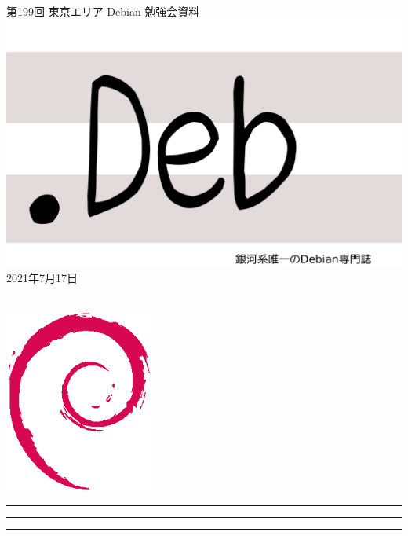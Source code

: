 \documentclass[mingoth,a4paper]{jsarticle}
\newcommand{\debmtgyear}{2021}
\newcommand{\debmtgmonth}{7}
\newcommand{\debmtgdate}{17}
\newcommand{\debmtgnumber}{199}
\begin{document}
\begin{titlepage}
\thispagestyle{empty}

\vspace*{-2cm}
第\debmtgnumber{}回 東京エリア Debian 勉強会資料\\
\hspace*{-2cm}
\includegraphics{image-assets/dotdeb.pdf}\\
\hfill{}\debmtgyear{}年\debmtgmonth{}月\debmtgdate{}日

\\

\vspace*{-2cm}
\hfill{}\includegraphics[height=6cm]{image-assets/openlogo-nd.eps}
\end{titlepage}

\newpage

\begin{minipage}[b]{0.2\hsize}
 \colorbox{titleback}{}
\end{minipage}
\begin{minipage}[b]{0.8\hsize}
\hrule
\vspace{2mm}
\hrule
\begin{multicols}{2}
\tableofcontents
\end{multicols}
\vspace{2mm}
\hrule
\end{minipage}
\end{document}
